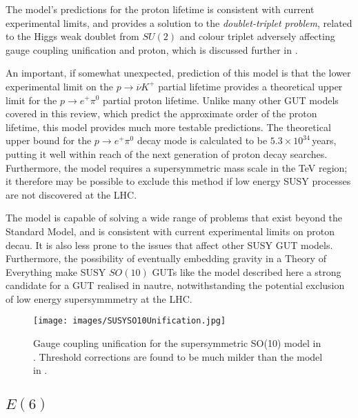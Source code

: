 \documentclass{article}
\begin{document}
The model's predictions for the proton lifetime is consistent with current experimental limits, and provides a solution to the \textit{doublet-triplet problem}, related to the Higgs weak doublet from $SU(2)$ and colour triplet adversely affecting gauge coupling unification and proton, which is discussed further in \cite{DTProblem}.

An important, if somewhat unexpected, prediction of this model is that the lower experimental limit on the $p\rightarrow \overline{\nu} K^+$ partial lifetime provides a theoretical upper limit for the $p\rightarrow e^+ \pi^0$ partial proton lifetime. Unlike many other GUT models covered in this review, which predict the approximate order of the proton lifetime, this model provides much more testable predictions. The theoretical upper bound for the $p\rightarrow e^+ \pi^0$ decay mode is calculated to be $5.3\times10^{34}\,$years, putting it well within reach of the next generation of proton decay searches.
Furthermore, the model requires a supersymmetric mass scale in the TeV region; it therefore may be possible to exclude this method if low energy SUSY processes are not discovered at the LHC. 

The model is capable of solving a wide range of problems that exist beyond the Standard Model, and is consistent with current experimental limits on proton decau. It is also less prone to the issues that affect other SUSY GUT models. Furthermore, the possibility of eventually embedding gravity in a Theory of Everything make SUSY $SO(10)$ GUTs like the model described here a strong candidate for a GUT realised in nautre, notwithstanding the potential exclusion of low energy supersymmmetry at the LHC.

\begin{figure}
    \centering
    \label{fig:SUSYSO10Coupling}
    \texttt{[image: images/SUSYSO10Unification.jpg]}
    \caption{Gauge coupling unification for the supersymmetric SO(10) model in \cite{SUSYSO10}. Threshold corrections are found to be much milder than the model in \cite{SO10_2}.}
\end{figure}


\subsection{$E(6)$}%
\label{sec:GUT_E6}
\end{document}
